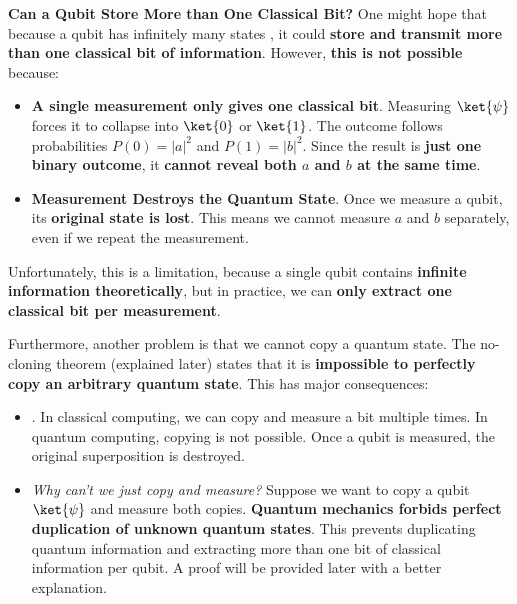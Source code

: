 \highspace
\textcolor{Green3}{ \textbf{Can a Qubit Store More than One Classical Bit?}} One might hope that because a qubit has infinitely many states
, it could \textbf{store and transmit more than one classical bit of information}. However, \textbf{this is not possible} because:
\begin{itemize}[label=\textcolor{Red2}{}]
    \item \textcolor{Red2}{\textbf{A single measurement only gives one classical bit}}. Measuring $\ket{\psi}$ forces it to collapse into $\ket{0}$ or $\ket{1}$. The outcome follows probabilities $P\left(0\right) = \left|a\right|^{2}$ and $P\left(1\right) = \left|b\right|^{2}$. Since the result is \textbf{just one binary outcome}, it \textbf{cannot reveal both $a$ and $b$ at the same time}.

    \item \textcolor{Red2}{\textbf{Measurement Destroys the Quantum State}}. Once we measure a qubit, its \textbf{original state is lost}. This means we cannot measure $a$ and $b$ separately, even if we repeat the measurement.
\end{itemize}
Unfortunately, this is a limitation, because a single qubit contains \textbf{infinite information theoretically}, but in practice, we can \textbf{only extract one classical bit per measurement}.

\newpage

\noindent
Furthermore, another problem is that we cannot copy a quantum state. The no-cloning theorem (explained later) states that it is \textbf{impossible to perfectly copy an arbitrary quantum state}. This has major consequences:
\begin{itemize}
    \item {}. In classical computing, we can copy and measure a bit multiple times. In quantum computing, copying is not possible. Once a qubit is measured, the original superposition is destroyed.

    \item \emph{Why can't we just copy and measure?} Suppose we want to copy a qubit $\ket{\psi}$ and measure both copies. \textbf{Quantum mechanics forbids perfect duplication of unknown quantum states}. This prevents duplicating quantum information and extracting more than one bit of classical information per qubit. A proof will be provided later with a better explanation.
\end{itemize}

